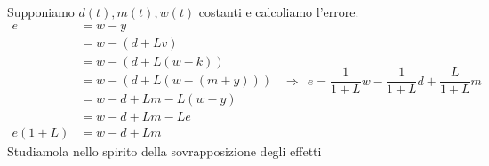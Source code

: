 \documentclass[10pt,a4paper]{book}
\begin{document}
Supponiamo $d(t) ,m(t) ,w(t)$ costanti e calcoliamo l'errore.
\begin{equation*}
	\begin{aligned}
		e      & =w-y              \\
		       & =w-(d+Lv)         \\
		       & =w-(d+L(w-k))     \\
		       & =w-(d+L(w-(m+y))) \\
		       & =w-d+Lm-L(w-y)    \\
		       & =w-d+Lm-Le        \\
		e(1+L) & =w-d+Lm           
	\end{aligned} \ \ \Rightarrow \ \ \boxed{e=\frac{1}{1+L} w-\frac{1}{1+L} d+\frac{L}{1+L} m}
\end{equation*}
Studiamola nello spirito della sovrapposizione degli effetti
\end{document}

